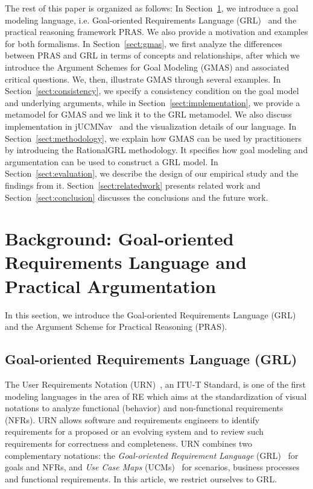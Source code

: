 \documentclass[11.5pt,two column]{llncs}
\begin{document}
The rest of this paper is organized as follows: In Section~\ref{sect:background}, we introduce a goal modeling language, i.e. Goal-oriented Requirements Language (GRL)~\cite{} and the practical reasoning framework PRAS. We also provide a motivation and examples for both formalisms. In Section~\ref{sect:gmas}, we first analyze the differences between PRAS and GRL in terms of concepts and relationships, after which we introduce the Argument Schemes for Goal Modeling (GMAS) and associated critical questions. We, then, illustrate GMAS through several examples. In Section~\ref{sect:consistency}, we specify a consistency condition on the goal model and underlying arguments, while in Section~\ref{sect:implementation}, we provide a metamodel for GMAS and we link it to the GRL metamodel. We also discuss implementation in jUCMNav~\cite{} and the visualization details of our language.%
In Section~\ref{sect:methodology}, we explain how GMAS can be used by practitioners by introducing the RationalGRL methodology. It specifies how goal modeling and argumentation can be used to construct a GRL model. In Section~\ref{sect:evaluation}, we describe the design of our empirical study and the findings from it. Section~\ref{sect:relatedwork} presents related work and Section~\ref{sect:conclusion} discusses the conclusions and the future work.

\section{Background: Goal-oriented Requirements Language and Practical Argumentation}
\label{sect:background}

In this section, we introduce the Goal-oriented Requirements Language (GRL) and the Argument Scheme for Practical Reasoning (PRAS). 

\subsection{Goal-oriented Requirements Language (GRL)}
\label{sect:background:grl}

The User Requirements Notation (URN)~\cite{URN}, an ITU-T Standard, is one of the first modeling languages in the area of RE which aims at the standardization of visual notations to analyze functional (behavior) and non-functional requirements (NFRs). %
URN allows software and requirements engineers to identify  requirements for a proposed or an evolving system and to review such requirements for correctness and completeness. URN combines two complementary notations: the \emph{Goal-oriented Requirement Language} (GRL)~\cite{Amyot:2010:EGM:1841349.1841356} for goals and NFRs, and \emph{Use Case Maps} (UCMs)~\cite{Weiss05designing} for scenarios, business processes and functional requirements. In this article, we restrict ourselves to GRL.
\end{document}
